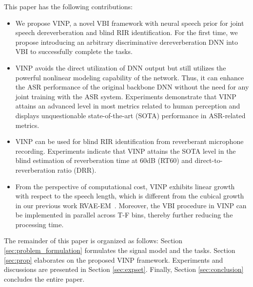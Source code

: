 This paper has the following contributions:
\begin{itemize}
    \item We propose VINP, a novel VBI framework with neural speech prior for joint speech dereverberation and blind RIR identification.
    For the first time, we propose introducing an arbitrary discriminative dereverberation DNN into VBI to successfully complete the tasks.
    \item 
    VINP avoids the direct utilization of DNN output but still utilizes the powerful nonlinear modeling capability of the network.
    Thus, it can enhance the ASR performance of the original backbone DNN without the need for any joint training with the ASR system.
    Experiments demonstrate that VINP attains an advanced level in most metrics related to human perception and displays unquestionable state-of-the-art (SOTA) performance in ASR-related metrics.
    \item 
    VINP can be used for blind RIR identification from reverberant microphone recording.
    Experiments indicate that VINP attains the SOTA level in the blind estimation of reverberation time at 60dB (RT60) and direct-to-reverberation ratio (DRR). 
    \item From the perspective of computational cost, VINP exhibits linear growth with respect to the speech length, which is different from the cubical growth in our previous work RVAE-EM~\cite{wang2024rvae}.
    Moreover, the VBI procedure in VINP can be implemented in parallel across T-F bins, thereby further reducing the processing time.
\end{itemize}

The remainder of this paper is organized as follows: 
Section \ref{sec:problem_formulation} formulates the signal model and the tasks.
Section \ref{sec:prop} elaborates on the proposed VINP framework. 
Experiments and discussions are presented in Section \ref{sec:expset}. 
Finally, Section \ref{sec:conclusion} concludes the entire paper.
